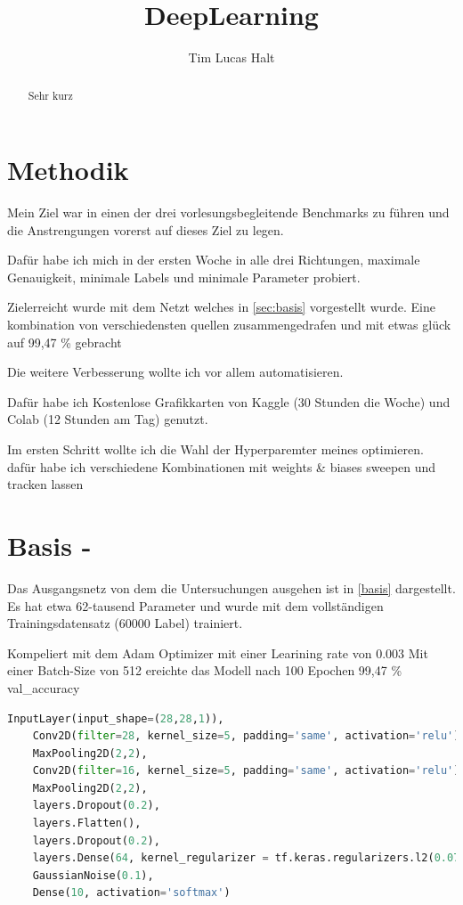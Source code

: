 \documentclass[
fontsize=12pt,					%
paper=a4,						%
twoside=true, 					%
listof=totoc, 					%
bibliography=totoc,				%
titlepage, 						%
headsepline, 					%
DIV=12,							%
BCOR=6mm,						%
cleardoublepage=empty,			%
parskip,							%
ngerman
]{scrartcl}
\title{DeepLearning}
\author{Tim Lucas Halt}
\begin{document}
\maketitle

\begin{abstract}

Sehr kurz

\end{abstract}

\section{Methodik}

Mein Ziel war in einen der drei vorlesungsbegleitende Benchmarks zu führen und die Anstrengungen vorerst auf dieses Ziel zu legen.

Dafür habe ich mich in der ersten Woche in alle drei Richtungen, maximale Genauigkeit, minimale Labels und minimale Parameter probiert.

Zielerreicht wurde mit dem Netzt welches in \autoref{sec:basis} vorgestellt wurde. Eine kombination von verschiedensten quellen zusammengedrafen und mit etwas glück auf 99,47 \% gebracht

Die weitere Verbesserung wollte ich vor allem automatisieren.

Dafür habe ich Kostenlose Grafikkarten von Kaggle (30 Stunden die Woche) und Colab (12 Stunden am Tag) genutzt. 

Im ersten Schritt wollte ich die Wahl der Hyperparemter meines optimieren. dafür habe ich verschiedene Kombinationen mit weights \& biases sweepen und tracken lassen


\section{Basis -  }
\label{sec:basis}

Das Ausgangsnetz von dem die Untersuchungen ausgehen ist in \autoref{basis} dargestellt. Es hat etwa 62-tausend Parameter und wurde mit dem vollständigen Trainingsdatensatz (60000 Label) trainiert.

Kompeliert mit dem Adam Optimizer mit einer Learining rate von 0.003 Mit einer Batch-Size von 512 ereichte das Modell nach 100 Epochen 99,47  \% val\_accuracy

\begin{lstlisting}[language=Python, caption=Python-Code, label=basis]
	InputLayer(input_shape=(28,28,1)),
	Conv2D(filter=28, kernel_size=5, padding='same', activation='relu'),
	MaxPooling2D(2,2),
	Conv2D(filter=16, kernel_size=5, padding='same', activation='relu'),
	MaxPooling2D(2,2),
	layers.Dropout(0.2),
	layers.Flatten(),
	layers.Dropout(0.2),
	layers.Dense(64, kernel_regularizer = tf.keras.regularizers.l2(0.07), activation = 'relu'),
	GaussianNoise(0.1),
	Dense(10, activation='softmax')
\end{lstlisting}
\end{document}
